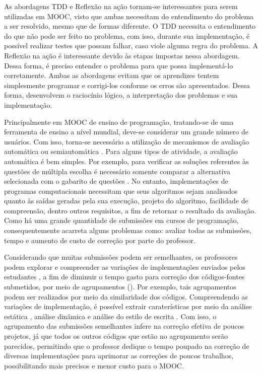 	As abordagens \acl{TDD} e Reflexão na ação tornam-se interessantes para serem
	utilizadas em \acl{MOOC}, visto que ambas necessitam do entendimento do problema
	a ser resolvido, mesmo que de formas diferente. O \acl{TDD} necessita o entendimento
	do que não pode ser feito no problema, com isso, durante sua implementação, é
	possível realizar testes que possam falhar, caso viole alguma regra do problema.
	A Reflexão na ação é interessante devido às etapas impostas nessa abordagem.
	Dessa forma, é preciso entender o problema para que possa implementá-lo corretamente.
	Ambas as abordagens evitam que os aprendizes tentem simplesmente programar e
	corrigi-los conforme os erros são apresentados. Dessa forma, desenvolvem o
	raciocínio lógico, a interpretação dos problemas e sua implementação.
	
	Principalmente em \acs{MOOC} de ensino de programação, tratando-se de uma ferramenta de
	ensino a nível mundial, deve-se considerar um grande número de usuários. Com isso,
	torna-se necessário a utilização de mecanismos de avaliação automática ou
	semiautomática \cite{schmidt2013producing}. Para alguns tipos de atividade, a
	avaliação automática é bem simples. Por exemplo, para verificar as soluções
	referentes às questões de múltipla escolha é necessário somente comparar a
	alternativa selecionada com o gabarito de questões \cite{alario2013analysing}. No
	entanto, implementações de programas computacionais necessitam que seus algoritmos
	sejam analisados quanto às saídas geradas pela sua execução, projeto do algoritmo,
	facilidade de compreensão, dentro outros requisitos, a fim de retornar o resultado
	da avaliação. Como há uma grande quantidade de submissões em cursos de programação,
	consequentemente acarreta alguns problemas como: avaliar todas as submissões, tempo
	e aumento de custo de correção por parte do professor.
	
	
	
	Considerando que muitas submissões podem ser semelhantes, os professores podem explorar
	e compreender as variações de implementações enviados pelos estudantes \cite{Yin:2015}, a fim de diminuir
	o tempo gasto para correção dos códigos-fontes submetidos, por meio de agrupamentos
	(). Por exemplo, tais agrupamentos podem ser realizados por meio
	da similaridade dos códigos. Compreendendo as variações de implementação, é possível
	extrair caraterísticas por meio da análise estática \cite{Yin:2015,Glassman:2014,Taherkhani:2012},
	análise dinâmica \cite{Glassman:2015} e análise do estilo de escrita \cite{Wei2015}.
	Com	isso, o agrupamento das submissões semelhantes infere na correção efetiva de
	poucos projetos, já que todos os outros códigos que estão no agrupamento serão
	parecidos, permitindo que o professor dedique o tempo poupado na correção de diversas
	implementações para aprimorar as correções de poucos trabalhos, possibilitando
	 mais precisos e menor custo para o \acs{MOOC}.
	
